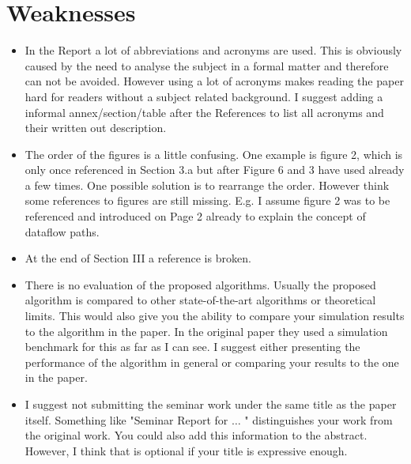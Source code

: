 \documentclass[12pt,british,a4paper]{article}
\begin{document}
\section{Weaknesses}\begin{itemize}
    \item In the Report a lot of abbreviations and acronyms are used.
    This is obviously caused by the need to analyse the subject in a formal matter and therefore can not be avoided. However using a lot of acronyms makes reading the paper hard for readers without a subject related background. I suggest adding a informal annex/section/table after the References to list all acronyms and their written out description.
    \item The order of the figures is a little confusing.
    One example is figure 2, which is only once referenced in Section 3.a but after Figure 6 and 3 have used already a few times. One possible solution is to rearrange the order. However think some references to figures are still missing. E.g. I assume figure 2 was to be referenced and introduced on Page 2 already to explain the concept of dataflow paths.
    \item At the end of Section III a reference is broken.
    \item There is no evaluation of the proposed algorithms.
    Usually the proposed algorithm is compared to other state-of-the-art algorithms or theoretical limits. This would also give you the ability to compare your simulation results to the algorithm in the paper. In the original paper they used a simulation benchmark for this as far as I can see. I suggest either presenting the performance of the algorithm in general or comparing your results to the one in the paper.
    \item I suggest not submitting the seminar work under the same title as the paper itself. Something like "Seminar Report for $\dots$ " distinguishes your work from the original work. You could also add this information to the abstract. However, I think that is optional if your title is expressive enough.
\end{itemize}
\end{document}
